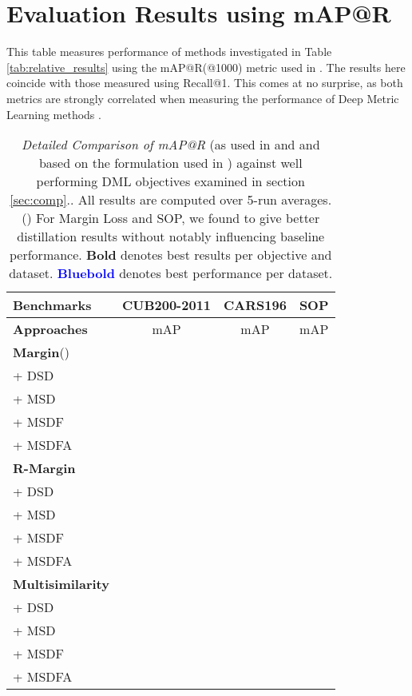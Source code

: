 \documentclass{article} \usepackage{arxiv_style,times}
\newcommand{\blue}[1]{\textcolor{blue}{#1}}
\begin{document}
 
\section{Evaluation Results using mAP@R}\label{supp:detailed_map}
This table measures performance of methods investigated in Table \ref{tab:relative_results} using the mAP@R(@1000) metric used in \cite{roth2020revisiting}. The results here coincide with those measured using Recall@1. This comes at no surprise, as both metrics are strongly correlated when measuring the performance of Deep Metric Learning methods \citep{roth2020revisiting}.
\begin{table}[h]
\caption{\textit{Detailed Comparison of mAP@R} (as used in \cite{roth2020revisiting} and \cite{musgrave2020metric} and based on the formulation used in \cite{roth2020revisiting}) against well performing DML objectives examined in section \ref{sec:comp}.. All results are computed over 5-run averages. () For Margin Loss and SOP, we found  to give better distillation results without notably influencing baseline performance. \textbf{Bold} denotes best results per objective and dataset. \blue{\textbf{Bluebold}} denotes best performance per dataset.}
 \footnotesize
   \setlength\tabcolsep{1.4pt}
   \centering
\begin{tabular}{l|c||c||c}
     \toprule
     \multicolumn{1}{l}{\textbf{Benchmarks}} & \multicolumn{1}{c}{\textsc{CUB200-2011}} & \multicolumn{1}{c}{\textsc{CARS196}} & \multicolumn{1}{c}{\textsc{SOP}} \\
     \midrule
     \textbf{Approaches}  & mAP & mAP & mAP\\
    \midrule
    \rowcolor{vvlightgray}
    \textbf{Margin}() &  &  &  \\        
    + DSD &  &  & \\
    + MSD &  &  & \\
    + MSDF &  &  & \blue{}\\
    + MSDFA &  &  & \\
    \midrule
    \rowcolor{vvlightgray}
    \textbf{R-Margin} &  &  & \\ 
    + DSD &  &  & \\
    + MSD &  &  & \\
    + MSDF &  &  & \\
    + MSDFA & \blue{} & \blue{} & \\
    \midrule
    \rowcolor{vvlightgray}
    \textbf{Multisimilarity} &  &  & \\
    + DSD &  &  & \\
    + MSD &  &  & \\
    + MSDF &  &  & \\
    + MSDFA &  &  & \\
         

    \bottomrule
    \end{tabular}
    \label{tab:relative_results_map}
 \end{table}
 
\end{document}
